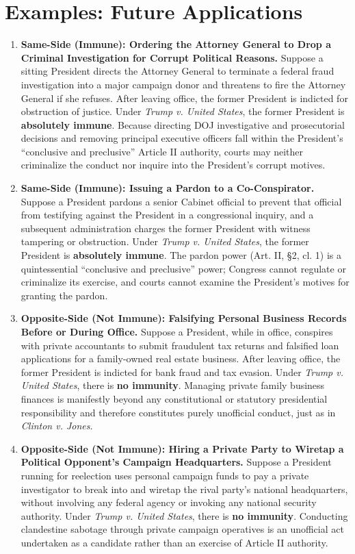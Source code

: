 \documentclass[12pt]{article}
\begin{document}
\section{Examples: Future Applications}

\begin{enumerate}
\item \textbf{Same-Side (Immune): Ordering the Attorney General to Drop a Criminal Investigation for Corrupt Political Reasons.} Suppose a sitting President directs the Attorney General to terminate a federal fraud investigation into a major campaign donor and threatens to fire the Attorney General if she refuses. After leaving office, the former President is indicted for obstruction of justice. Under \textit{Trump v. United States}, the former President is \textbf{absolutely immune}. Because directing DOJ investigative and prosecutorial decisions and removing principal executive officers fall within the President's ``conclusive and preclusive'' Article II authority, courts may neither criminalize the conduct nor inquire into the President's corrupt motives.
\item \textbf{Same-Side (Immune): Issuing a Pardon to a Co-Conspirator.} Suppose a President pardons a senior Cabinet official to prevent that official from testifying against the President in a congressional inquiry, and a subsequent administration charges the former President with witness tampering or obstruction. Under \textit{Trump v. United States}, the former President is \textbf{absolutely immune}. The pardon power (Art. II, \S 2, cl. 1) is a quintessential ``conclusive and preclusive'' power; Congress cannot regulate or criminalize its exercise, and courts cannot examine the President's motives for granting the pardon.
\item \textbf{Opposite-Side (Not Immune): Falsifying Personal Business Records Before or During Office.} Suppose a President, while in office, conspires with private accountants to submit fraudulent tax returns and falsified loan applications for a family-owned real estate business. After leaving office, the former President is indicted for bank fraud and tax evasion. Under \textit{Trump v. United States}, there is \textbf{no immunity}. Managing private family business finances is manifestly beyond any constitutional or statutory presidential responsibility and therefore constitutes purely unofficial conduct, just as in \textit{Clinton v. Jones}.
\item \textbf{Opposite-Side (Not Immune): Hiring a Private Party to Wiretap a Political Opponent's Campaign Headquarters.} Suppose a President running for reelection uses personal campaign funds to pay a private investigator to break into and wiretap the rival party's national headquarters, without involving any federal agency or invoking any national security authority. Under \textit{Trump v. United States}, there is \textbf{no immunity}. Conducting clandestine sabotage through private campaign operatives is an unofficial act undertaken as a candidate rather than an exercise of Article II authority.

\end{enumerate}
\end{document}
